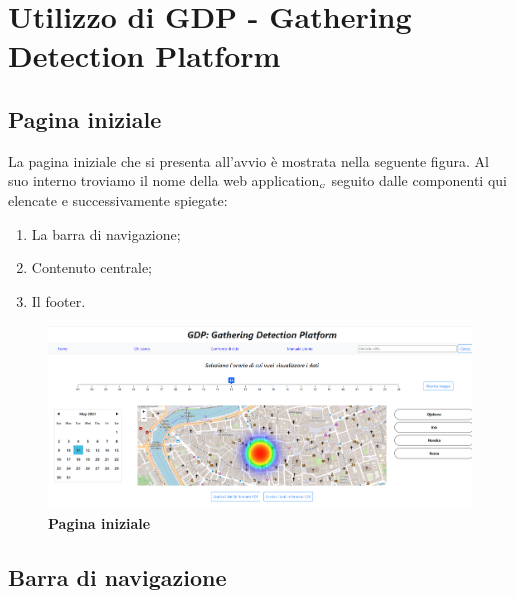 
\chapter{Utilizzo di GDP - Gathering Detection Platform}\label{UtilizzoDiGDPGatheringDetecionPlatform}

\section{Pagina iniziale}\label{UtilizzoDiGDPGatheringDetecionPlatformPaginaIniziale}
La pagina iniziale che si presenta all'avvio è mostrata nella seguente figura.
Al suo interno troviamo il nome della web application$_{\scaleto{G}{3pt}}$ seguito dalle componenti qui elencate e successivamente spiegate:
\begin{enumerate}
	\item La barra di navigazione;
	\item Contenuto centrale;
	\item Il footer.
\end{enumerate}

\begin{center}
	\begin{figure}[H]
		\centering\includegraphics[width=0.9\linewidth]{../immagini/manualeUtente/heatmapsenzapopup.png}
		\caption{\textbf{\textbf{\textbf{Pagina iniziale}}}}
	\end{figure}
\end{center}

\section{Barra di navigazione}\label{UtilizzoDiGDPGatheringDetecionPlatformBarraDiNavigazione}

